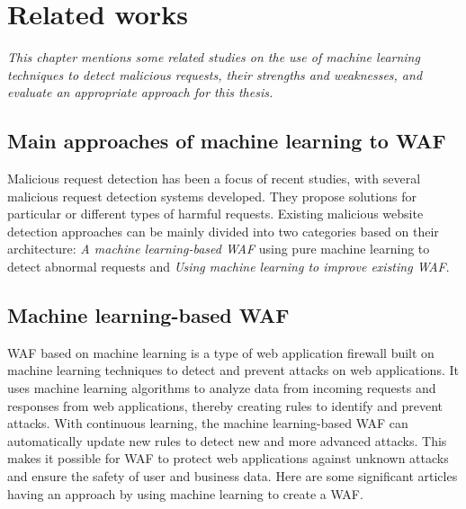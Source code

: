 \chapter{Related works}
\label{chap:literaturereview}
	\textit{\hspace{0.5cm}This chapter mentions some related studies on the use of machine learning techniques to detect malicious requests, their strengths and weaknesses, and evaluate an appropriate approach for this thesis.}
\minitoc
\newpage	
\section{Main approaches of machine learning to WAF}
\hspace{0.5cm}Malicious request detection has been a focus of recent studies, with several malicious request detection systems developed. They propose solutions for particular or different types of harmful requests. Existing malicious website detection approaches can be mainly divided into two categories based on their architecture: \emph{A machine learning-based WAF} using pure machine learning to detect abnormal requests and \emph{Using machine learning to improve existing WAF}.


\section{Machine learning-based WAF}
\label{sec:machine_learning_based}
\hspace{0.5cm}WAF based on machine learning is a type of web application firewall built on machine learning techniques to detect and prevent attacks on web applications. It uses machine learning algorithms to analyze data from incoming requests and responses from web applications, thereby creating rules to identify and prevent attacks.
With continuous learning, the machine learning-based WAF can automatically update new rules to detect new and more advanced attacks. This makes it possible for WAF to protect web applications against unknown attacks and ensure the safety of user and business data. Here are some significant articles having an approach by using machine learning to create a WAF. 

